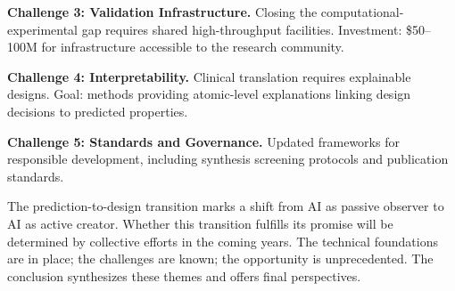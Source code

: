 \textbf{Challenge 3: Validation Infrastructure.} Closing the computational-experimental gap requires shared high-throughput facilities. Investment: \$50--100M for infrastructure accessible to the research community.

\textbf{Challenge 4: Interpretability.} Clinical translation requires explainable designs. Goal: methods providing atomic-level explanations linking design decisions to predicted properties.

\textbf{Challenge 5: Standards and Governance.} Updated frameworks for responsible development, including synthesis screening protocols and publication standards.

\vspace{0.5em}
\noindent
The prediction-to-design transition marks a shift from AI as passive observer to AI as active creator. Whether this transition fulfills its promise will be determined by collective efforts in the coming years. The technical foundations are in place; the challenges are known; the opportunity is unprecedented. The conclusion synthesizes these themes and offers final perspectives.
